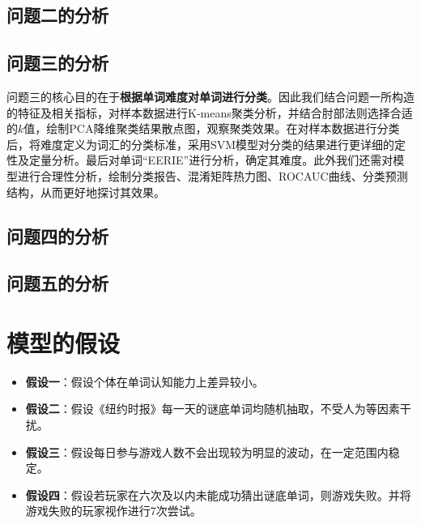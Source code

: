 \documentclass{MathModeling}
\begin{document}
	\subsection{问题二的分析}

	\subsection{问题三的分析}
	问题三的核心目的在于\textbf{根据单词难度对单词进行分类}。因此我们结合问题一所构造的特征及相关指标，对样本数据进行K-means聚类分析，并结合肘部法则选择合适的$k$值，绘制PCA降维聚类结果散点图，观察聚类效果。在对样本数据进行分类后，将难度定义为词汇的分类标准，采用SVM模型对分类的结果进行更详细的定性及定量分析。最后对单词“EERIE”进行分析，确定其难度。此外我们还需对模型进行合理性分析，绘制分类报告、混淆矩阵热力图、ROCAUC曲线、分类预测结构，从而更好地探讨其效果。

	\subsection{问题四的分析}
	
	\subsection{问题五的分析}
	
	\section{模型的假设}
	\begin{itemize}
		\item \textbf{假设一}：假设个体在单词认知能力上差异较小。
		\item \textbf{假设二}：假设《纽约时报》每一天的谜底单词均随机抽取，不受人为等因素干扰。
		\item \textbf{假设三}：假设每日参与游戏人数不会出现较为明显的波动，在一定范围内稳定。
		\item \textbf{假设四}：假设若玩家在六次及以内未能成功猜出谜底单词，则游戏失败。并将游戏失败的玩家视作进行7次尝试。
	\end{itemize}
\end{document}
